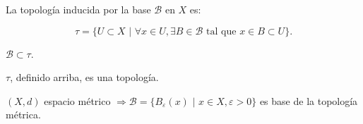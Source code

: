 	\begin{definition}
		La topología inducida por la base $\mathcal{B}$ en $X$ es:

		\[
		\tau = \{ U \subset X \text{ | } \forall x \in U, \exists B \in \mathcal{B} \text{ tal que } x \in B \subset U \}.
		\]
	\end{definition}

	\begin{note}
		$\mathcal{B} \subset \tau$.
	\end{note}

	\begin{lemma}
		$\tau$, definido arriba, es una topología.
	\end{lemma}

	\begin{eg}
		$(X,d)$ espacio métrico $\Rightarrow \mathcal{B} = \{ B_{\varepsilon} (x) \text{ | } x \in X, \varepsilon > 0 \}$ es base de la topología métrica.
	\end{eg}
